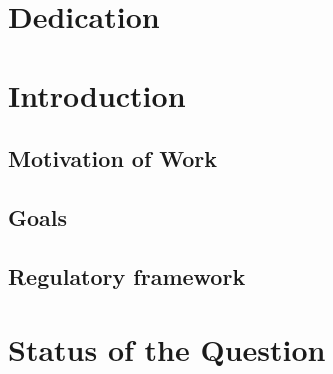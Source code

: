 \documentclass[12pt]{report} %
\begin{document}
\chapter*{Dedication}

\setcounter{page}{5}
	
	\lipsum [4-5]	
		
	\vfill
	
	\newpage %
	\thispagestyle{empty}
	\mbox{}
	


\tableofcontents
\thispagestyle{fancy}

\newpage %
\thispagestyle{empty}
\mbox{}

\listoffigures
\thispagestyle{fancy}

\newpage %
\thispagestyle{empty}
\mbox{}

\listoftables
\thispagestyle{fancy}

\newpage %
\thispagestyle{empty}
\mbox{}


\clearpage
{} %

\chapter{Introduction}

\section{Motivation of Work}
\lipsum[1-3]

\section{Goals}
\lipsum[1-2]

\section{Regulatory framework}
\lipsum[5-6]


\chapter{Status of the Question}
\end{document}
